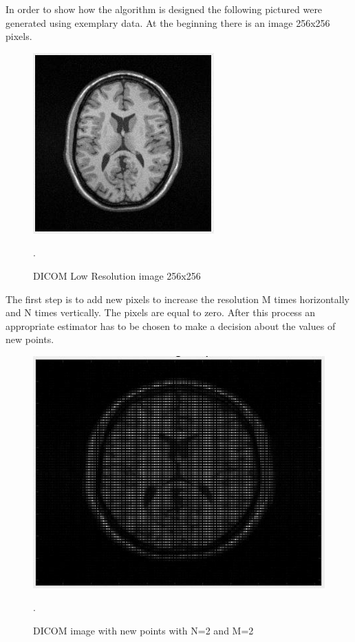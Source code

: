In order to show how the algorithm is designed the following pictured were generated using exemplary data. At the beginning there is an image 256x256 pixels. 

\begin{figure}[H]
\centering{}\includegraphics[scale=0.7]{figures/Module9_2}\caption{DICOM Low Resolution image 256x256}. 
\label{fig:figures/Module9_2}
\end{figure}

The first step is to add new pixels to increase the resolution M times horizontally and N times vertically. The pixels are equal to zero. After this process an appropriate estimator has to be chosen to make a decision about the values of new points.

\begin{figure}[H]
\centering{}\includegraphics[scale=0.7]{figures/Module9_3}\caption{DICOM image with new points with N=2 and M=2}. 
\label{fig:figures/Module9_3}
\end{figure}


